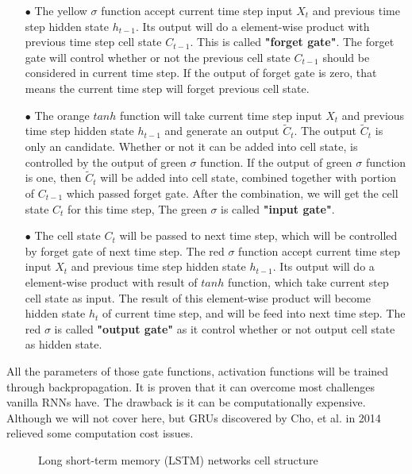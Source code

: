 \documentclass[10pt,twocolumn,letterpaper]{article}
\begin{document}
\begin{itemize}
\item[$\bullet$] The yellow $\sigma$ function accept current time step input $X_t$ and previous time step hidden state $h_{t-1}$. Its output will do a element-wise product with previous time step cell state $C_{t-1}$. This is called \textbf{"forget gate"}. The forget gate will control whether or not the previous cell state $C_{t-1}$ should be considered in current time step. If the output of forget gate is zero, that means the current time step will forget previous cell state.
\item[$\bullet$] The orange $tanh$ function will take current time step input $X_t$ and previous time step hidden state $h_{t-1}$ and generate an output $\tilde{C}_t$. The output $\tilde{C}_t$ is only an candidate. Whether or not it can be added into cell state, is controlled by the output of green $\sigma$ function. If the output of green $\sigma$ function is one, then $\tilde{C}_t$ will be added into cell state, combined together with portion of $C_{t-1}$ which passed forget gate. After the combination, we will get the cell state $C_t$ for this time step, The green $\sigma$ is called \textbf{"input gate"}.
\item[$\bullet$] The cell state $C_t$ will be passed to next time step, which will be controlled by forget gate of next time step. The red $\sigma$ function accept current time step input $X_t$ and previous time step hidden state $h_{t-1}$. Its output will do a element-wise product with result of $tanh$ function, which take current step cell state as input. The result of this element-wise product will become hidden state $h_t$ of current time step, and will be feed into next time step. The red $\sigma$ is called \textbf{"output gate"} as it control whether or not output cell state as hidden state.

\end{itemize}

All the parameters of those gate functions, activation functions will be trained through backpropagation. It is proven that it can overcome most challenges vanilla RNNs have. The drawback is it can be computationally expensive. Although we will not cover here, but GRUs discovered by Cho, et al. in 2014 relieved some computation cost issues.


\begin{figure}[H]
\begin{center}
\end{center}
   \caption{Long short-term memory (LSTM) networks cell structure \cite{Authors12}}
\end{figure}
\end{document}
